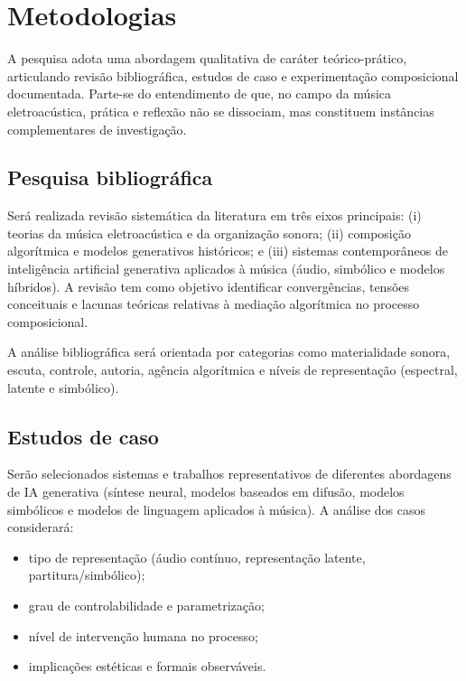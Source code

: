 \chapter{Metodologias}

A pesquisa adota uma abordagem qualitativa de caráter teórico-prático, articulando revisão bibliográfica, estudos de caso e experimentação composicional documentada. Parte-se do entendimento de que, no campo da música eletroacústica, prática e reflexão não se dissociam, mas constituem instâncias complementares de investigação.

\section{Pesquisa bibliográfica}

Será realizada revisão sistemática da literatura em três eixos principais: (i) teorias da música eletroacústica e da organização sonora; (ii) composição algorítmica e modelos generativos históricos; e (iii) sistemas contemporâneos de inteligência artificial generativa aplicados à música (áudio, simbólico e modelos híbridos). A revisão tem como objetivo identificar convergências, tensões conceituais e lacunas teóricas relativas à mediação algorítmica no processo composicional.

A análise bibliográfica será orientada por categorias como materialidade sonora, escuta, controle, autoria, agência algorítmica e níveis de representação (espectral, latente e simbólico).

\section{Estudos de caso}

Serão selecionados sistemas e trabalhos representativos de diferentes abordagens de IA generativa (síntese neural, modelos baseados em difusão, modelos simbólicos e modelos de linguagem aplicados à música). A análise dos casos considerará:

\begin{itemize}
  \item tipo de representação (áudio contínuo, representação latente, partitura/simbólico);
  \item grau de controlabilidade e parametrização;
  \item nível de intervenção humana no processo;
  \item implicações estéticas e formais observáveis.
\end{itemize}

